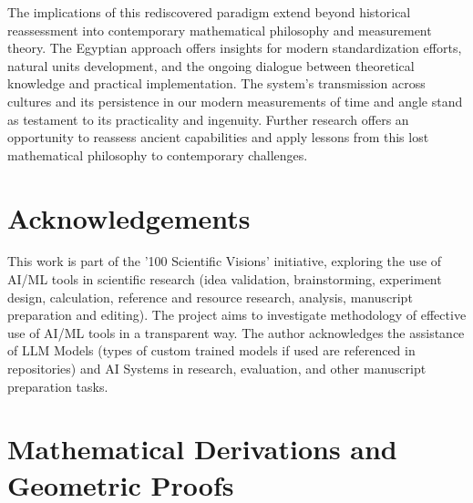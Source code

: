 \documentclass[11pt]{article}
\begin{document}
The implications of this rediscovered paradigm extend beyond historical reassessment into contemporary mathematical philosophy and measurement theory. The Egyptian approach offers insights for modern standardization efforts, natural units development, and the ongoing dialogue between theoretical knowledge and practical implementation. The system's transmission across cultures and its persistence in our modern measurements of time and angle stand as testament to its practicality and ingenuity. Further research offers an opportunity to reassess ancient capabilities and apply lessons from this lost mathematical philosophy to contemporary challenges.


\section*{Acknowledgements}
\label{sec:acknowledgements} %

This work is part of the '100 Scientific Visions' initiative, exploring the use of AI/ML tools in scientific research (idea validation, brainstorming, experiment design, calculation, reference and resource research, analysis, manuscript preparation and editing). The project aims to investigate methodology of effective use of AI/ML tools in a transparent way. The author acknowledges the assistance of LLM Models (types of custom trained models if used are referenced in repositories) and AI Systems in research, evaluation, and other manuscript preparation tasks.


\newpage




\appendix
\section{Mathematical Derivations and Geometric Proofs}
\end{document}
